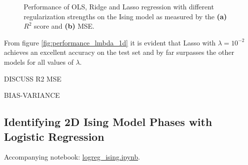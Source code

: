 \begin{figure}[H]
\centering
{}
\qquad
{}
\caption{Performance of OLS, Ridge and Lasso regression with different regularization strengths on the Ising model as measured by the \textbf{(a)} $R^2$ score and \textbf{(b)} MSE.}
\label{fig:performance_lmbda_1d}
\end{figure}

From figure \autoref{fig:performance_lmbda_1d} it is evident that Lasso with $\lambda=10^{-2}$ achieves an excellent accuracy on the test set and by far surpasses the other models for all values of $\lambda$. 



DISCUSS R2 MSE

BIAS-VARIANCE

\subsection{Identifying 2D Ising Model Phases with Logistic Regression}\label{sec:results logreg}
Accompanying notebook: \href{https://github.com/nicolossus/FYS-STK4155-Project2/blob/master/notebooks/logreg_ising.ipynb}{logreg\_ising.ipynb}. 

